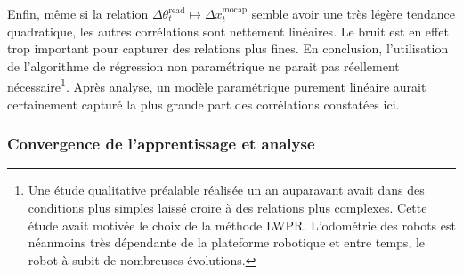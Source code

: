 Enfin, même si la relation $\Delta \theta_{t}^{\text{read}} \mapsto \Delta x_{t}^{\text{mocap}}$ 
semble avoir une très légère tendance quadratique, les autres corrélations sont nettement linéaires.
Le bruit est en effet trop important pour capturer des relations plus fines.
En conclusion, l'utilisation de l'algorithme de régression non paramétrique ne parait pas
réellement nécessaire\footnote{Une étude qualitative préalable réalisée un an auparavant avait 
dans des conditions plus simples laissé croire à des relations plus complexes. 
Cette étude avait motivée le choix de la méthode LWPR. L'odométrie des robots est néanmoins 
très dépendante de la plateforme robotique et entre temps, le robot à subit de nombreuses évolutions.}.
Après analyse, un modèle paramétrique purement linéaire aurait certainement capturé
la plus grande part des corrélations constatées ici.

\subsubsection{Convergence de l'apprentissage et analyse}

